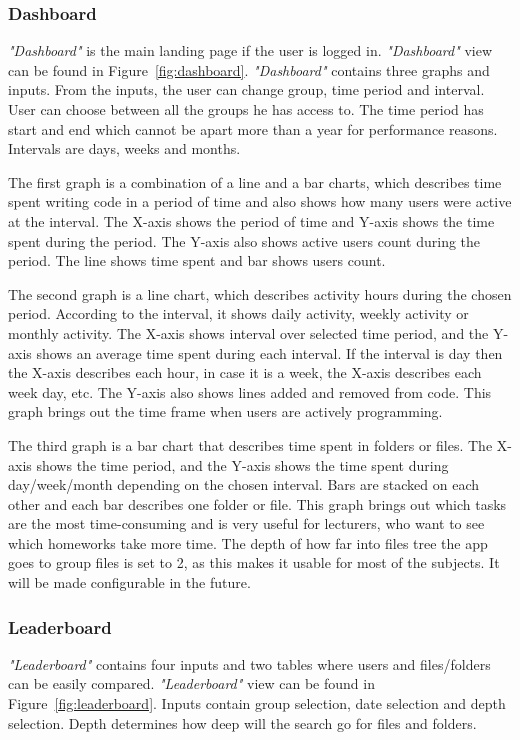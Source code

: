 \subsubsection{Dashboard}\label{subsubsec:dashboard}
\textit{"Dashboard"} is the main landing page if the user is logged in.
\textit{"Dashboard"} view can be found in Figure~\ref{fig:dashboard}.
\textit{"Dashboard"} contains three graphs and inputs.
From the inputs, the user can change group, time period and interval.
User can choose between all the groups he has access to. %
The time period has start and end which cannot be apart more than a year for performance reasons. %
Intervals are days, weeks and months.

The first graph is a combination of a line and a bar charts, which describes time spent writing code in a period of time and also shows how many users were active at the interval.
The X-axis shows the period of time and Y-axis shows the time spent during the period.
The Y-axis also shows active users count during the period.
The line shows time spent and bar shows users count.

The second graph is a line chart, which describes activity hours during the chosen period.
According to the interval, it shows daily activity, weekly activity or monthly activity.
The X-axis shows interval over selected time period, and the Y-axis shows an average time spent during each interval.
If the interval is day then the X-axis describes each hour, in case it is a week, the X-axis describes each week day, etc.
The Y-axis also shows lines added and removed from code.
This graph brings out the time frame when users are actively programming.

The third graph is a bar chart that describes time spent in folders or files.
The X-axis shows the time period, and the Y-axis shows the time spent during day/week/month depending on the chosen interval.
Bars are stacked on each other and each bar describes one folder or file.
This graph brings out which tasks are the most time-consuming and is very useful for lecturers, who want to see which homeworks take more time.
The depth of how far into files tree the app goes to group files is set to 2, as this makes
it usable for most of the subjects.
It will be made configurable in the future.

\subsubsection{Leaderboard}\label{subsubsec:leaderboard}
\textit{"Leaderboard"} contains four inputs and two tables where users and files/folders can be easily compared.
\textit{"Leaderboard"} view can be found in Figure~\ref{fig:leaderboard}.
Inputs contain group selection, date selection and depth selection.
Depth determines how deep will the search go for files and folders.

